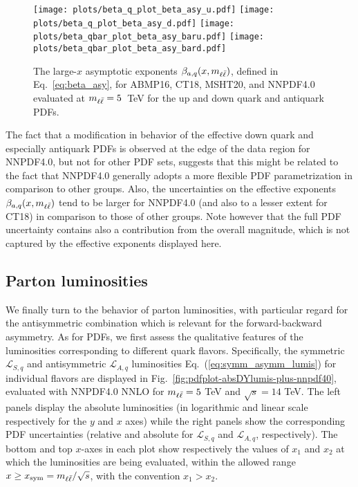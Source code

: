 \begin{figure}[!t]
 \centering
 \texttt{[image: plots/beta\_q\_plot\_beta\_asy\_u.pdf]}
 \texttt{[image: plots/beta\_q\_plot\_beta\_asy\_d.pdf]}
 \texttt{[image: plots/beta\_qbar\_plot\_beta\_asy\_baru.pdf]}
 \texttt{[image: plots/beta\_qbar\_plot\_beta\_asy\_bard.pdf]}
 \caption{\small The large-$x$ asymptotic exponents $\beta_{a,q}(x,m_{\ell\bar{\ell}})$, defined
   in Eq.~\eqref{eq:beta_asy},
   for ABMP16, CT18, MSHT20, and NNPDF4.0 evaluated at $m_{\ell\bar{\ell}}=5$~TeV
   for the up and down quark and antiquark PDFs.}    
 \label{fig:asy_exponents}
\end{figure}

The fact that a modification in behavior of the effective down quark
and especially antiquark PDFs is observed at the edge of the data
region for NNPDF4.0, but not for other PDF sets, suggests that this
might be related to the fact that  NNPDF4.0 generally adopts a more
flexible PDF parametrization in comparison to other groups.
%
Also, the  uncertainties on the effective exponents
$\beta_{a,q}(x,m_{\ell\bar{\ell}})$ tend to be larger for NNPDF4.0 (and also to a
lesser extent for CT18) in comparison to those of other groups.
Note however that the full PDF uncertainty contains also a
contribution from the overall 
magnitude, which is not captured by the effective exponents displayed here.

\subsection{Parton luminosities}
\label{subsec:partoniclumis}

We finally turn to the behavior of parton luminosities, with
particular regard for the antisymmetric combination which is relevant
for the forward-backward asymmetry.
As for PDFs, we first assess the qualitative features of the
luminosities corresponding to different quark flavors.
Specifically, the symmetric $\mathcal{L}_{S,q}$ and antisymmetric
$\mathcal{L}_{A,q}$ luminosities
Eq.~(\ref{eq:symm_asymm_lumis})  for individual flavors are
displayed in Fig.~\ref{fig:pdfplot-absDYlumis-plus-nnpdf40},
evaluated with NNPDF4.0 NNLO for $m_{\ell\bar{\ell}}=5$ TeV and $\sqrt{s}=14$ TeV.
%
The left panels display the absolute luminosities (in logarithmic and
linear scale respectively
for the $y$ and $x$ axes)
while the right panels show the corresponding PDF uncertainties (relative and absolute for
$\mathcal{L}_{S,q}$ and $\mathcal{L}_{A,q}$, respectively).
%
The bottom  and top $x$-axes in each plot show respectively the values
of $x_1$ and $x_2$  at which the
luminosities are being evaluated, within the allowed range
$x \ge x_{\rm sym}=m_{\ell\bar{\ell}}/\sqrt{s}$, with the convention $x_1>x_2$.

